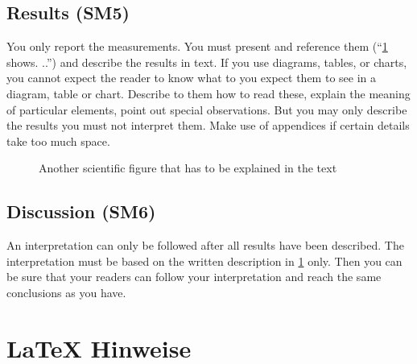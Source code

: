 \documentclass[
  fontsize=10pt,
  numbers=noenddot,
  english,  %
  paper=a5,
  twoside,  %
  DIV=calc,
  headings=small,
  bibliography=totoc,
  listof=totoc,
  draft=false
]{scrbook}
\theoremstyle{break}
\begin{document}
\section{Results (SM5)}\label{sec:evaluation:results}

You only report the measurements.
You must present and reference them (``\cref{fig:my_label2} shows.
..'') and describe the results in text.
If you use diagrams, tables, or charts, you cannot expect the reader to know what to you expect them to see in a diagram, table or chart.
Describe to them how to read these, explain the meaning of particular elements, point out special observations.
But you may only describe the results you must not interpret them.
Make use of appendices if certain details take too much space.

\begin{figure}
  \centering
  \caption{Another scientific figure that has to be explained in the text}
  \label{fig:my_label2}
\end{figure}

\section{Discussion (SM6)}\label{sec:evaluation:discussion}

An interpretation can only be followed after all results have been described.
The interpretation must be based on the written description in \cref{sec:evaluation:results} only.
Then you can be sure that your readers can follow your interpretation and reach the same conclusions as you have.


\chapter{LaTeX Hinweise}
\label{sec:latexhints}

\newcount\LTGbeginlineexample
\newcount\LTGendlineexample
\newenvironment{ltgexample}%
{\LTGbeginlineexample=\numexpr\inputlineno+1\relax}%
{\LTGendlineexample=\numexpr\inputlineno-1\relax%
  \tcbinputlisting{%
    listing only,
    listing file=\currfilepath,
    colback=green!5!white,
    colframe=green!25,
    coltitle=black!90,
    coltext=black!90,
    left=8mm,
    title=Zugehöriger \LaTeX{}-Quelltext aus \texttt{\currfilepath},
    minted language=TeX,
    minted style=vs,
    minted options={
        fontsize=\footnotesize,
        firstline=\the\LTGbeginlineexample,
        lastline=\the\LTGendlineexample,
        firstnumber=\the\LTGbeginlineexample,
        breaklines,
        linenos,
        numbersep=8pt
      }
  }
}%
\end{document}
